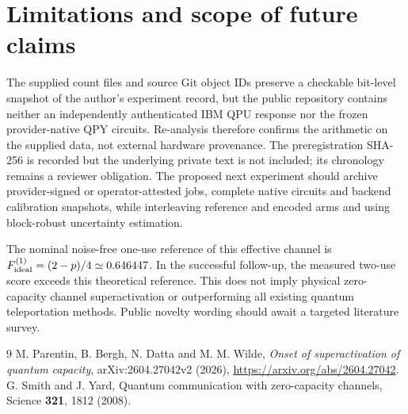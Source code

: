 \documentclass[11pt]{article}
\begin{document}
\section{Limitations and scope of future claims}
The supplied count files and source Git object IDs preserve a checkable bit-level snapshot of the author's experiment record, but the public repository contains neither an independently authenticated IBM QPU response nor the frozen provider-native QPY circuits. Re-analysis therefore confirms the arithmetic on the supplied data, not external hardware provenance. The preregistration SHA-256 is recorded but the underlying private text is not included; its chronology remains a reviewer obligation. The proposed next experiment should archive provider-signed or operator-attested jobs, complete native circuits and backend calibration snapshots, while interleaving reference and encoded arms and using block-robust uncertainty estimation.

The nominal noise-free one-use reference of this effective channel is $F^{(1)}_{\rm ideal}=(2-p)/4\simeq0.646447$. In the successful follow-up, the measured two-use score exceeds this theoretical reference. This does not imply physical zero-capacity channel superactivation or outperforming all existing quantum teleportation methods. Public novelty wording should await a targeted literature survey.

\begin{thebibliography}{9}
 M. Parentin, B. Bergh, N. Datta and M. M. Wilde, \emph{Onset of superactivation of quantum capacity}, arXiv:2604.27042v2 (2026), \url{https://arxiv.org/abs/2604.27042}.
 G. Smith and J. Yard, Quantum communication with zero-capacity channels, Science \textbf{321}, 1812 (2008).
\end{thebibliography}
\end{document}
